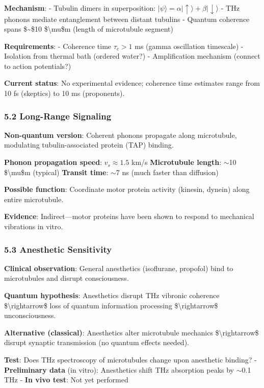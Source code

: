 \textbf{Mechanism}: - Tubulin dimers in superposition:
\(|\psi\rangle = \alpha|\uparrow\rangle + \beta|\downarrow\rangle\) -
THz phonons mediate entanglement between distant tubulins - Quantum
coherence spans \$\sim\$10 \$\textbackslash mu\$m (length of microtubule
segment)

\textbf{Requirements}: - Coherence time \(\tau_c > 1\) ms (gamma
oscillation timescale) - Isolation from thermal bath (ordered water?) -
Amplification mechanism (connect to action potentials?)

\textbf{Current status}: No experimental evidence; coherence time
estimates range from 10 fs (skeptics) to 10 ms (proponents).

\subsubsection{5.2 Long-Range Signaling}\label{long-range-signaling}

\textbf{Non-quantum version}: Coherent phonons propagate along
microtubule, modulating tubulin-associated protein (TAP) binding.

\textbf{Phonon propagation speed}: \(v_s \approx 1.5\) km/s
\textbf{Microtubule length}: $\sim$10 \$\textbackslash mu\$m
(typical) \textbf{Transit time}: $\sim$7 ns (much faster than
diffusion)

\textbf{Possible function}: Coordinate motor protein activity (kinesin,
dynein) along entire microtubule.

\textbf{Evidence}: Indirect---motor proteins have been shown to
respond to mechanical vibrations in vitro.

\subsubsection{5.3 Anesthetic Sensitivity}\label{anesthetic-sensitivity}

\textbf{Clinical observation}: General anesthetics (isoflurane,
propofol) bind to microtubules and disrupt consciousness.

\textbf{Quantum hypothesis}: Anesthetics disrupt THz vibronic coherence
\$\textbackslash rightarrow\$ loss of quantum information processing
\$\textbackslash rightarrow\$ unconsciousness.

\textbf{Alternative (classical)}: Anesthetics alter microtubule
mechanics \$\textbackslash rightarrow\$ disrupt synaptic transmission
(no quantum effects needed).

\textbf{Test}: Does THz spectroscopy of microtubules change upon
anesthetic binding? - \textbf{Preliminary data} (in vitro): Anesthetics
shift THz absorption peaks by $\sim$0.1 THz - \textbf{In vivo
test}: Not yet performed

